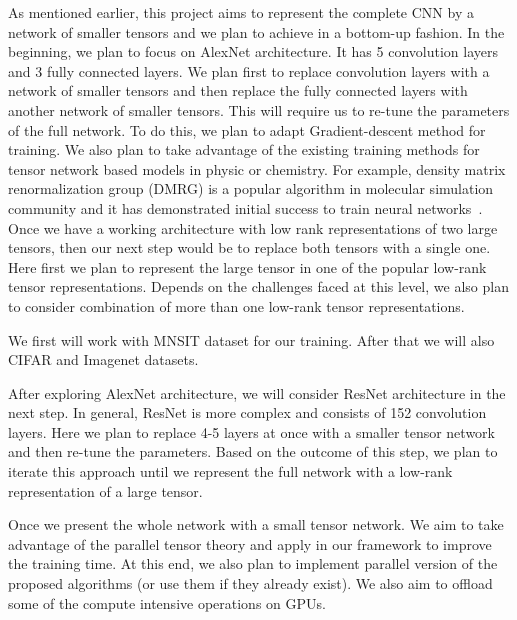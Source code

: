 As mentioned earlier, this project aims to represent the complete CNN by a network of smaller tensors and we plan to achieve in a bottom-up fashion. In the beginning, we plan to focus on AlexNet architecture. It has 5 convolution layers and 3 fully connected layers. We plan first to replace convolution layers with a network of smaller tensors and then replace the fully connected layers with another network of smaller tensors. This will require us to re-tune the parameters of the full network. To do this, we plan to adapt Gradient-descent method for training. We also plan to take advantage of the existing training methods for tensor network based models in physic or chemistry. For example, density matrix renormalization group (DMRG) is a popular algorithm in molecular simulation community and it has demonstrated initial success to train neural networks~\cite{SS-NIPS2016}. Once we have a working architecture with low rank representations of two large tensors, then our next step would be to replace both tensors with a single one. Here first we plan to represent the large tensor in one of the popular low-rank tensor representations. Depends on the challenges faced at this level, we also plan to consider combination of more than one low-rank tensor representations.    


We first will work with  MNSIT dataset for our training. After that we will also CIFAR and Imagenet datasets. 

After exploring AlexNet architecture, we will consider ResNet architecture in the next step. In general, ResNet is more complex and consists of 152 convolution layers. Here we plan to replace 4-5 layers at once with a smaller tensor network and then re-tune the parameters. Based on the outcome of this step, we plan to iterate this approach until we represent the full network with a low-rank representation of a large tensor.  

Once we present the whole network with a small tensor network. We aim to take advantage of the parallel tensor theory and apply in our framework to improve the training time. At this end, we also plan to implement parallel version of the proposed algorithms (or use them if they already exist). We also aim to offload some of the compute intensive operations on GPUs.   


